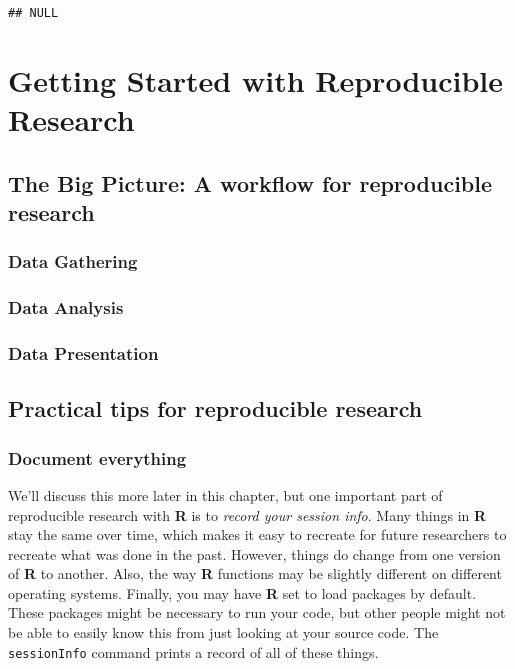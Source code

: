 \documentclass[ChapterTOCs,krantz1]{krantz}\usepackage{graphicx, color}
\makeatletter
\newenvironment{kframe}{%
 \def\at@end@of@kframe{}%
 \ifinner\ifhmode%
  \def\at@end@of@kframe{\end{minipage}}%
  \begin{minipage}{\columnwidth}%
 \fi\fi%
 \def\FrameCommand##1{\hskip\@totalleftmargin \hskip-\fboxsep
 \colorbox{shadecolor}{##1}\hskip-\fboxsep
     \hskip-\linewidth \hskip-\@totalleftmargin \hskip\columnwidth}%
 \MakeFramed {\advance\hsize-\width
   \@totalleftmargin\z@ \linewidth\hsize
   \@setminipage}}%
 {\par\unskip\endMakeFramed%
 \at@end@of@kframe}
\newenvironment{knitrout}{}{} %
\makeatother
\begin{document}
\begin{knitrout}
\color{fgcolor}\begin{kframe}
\begin{verbatim}
## NULL
\end{verbatim}
\end{kframe}
\end{knitrout}


\chapter{Getting Started with Reproducible Research}

\section{The Big Picture: A workflow for reproducible research}

\subsection{Data Gathering}

\subsection{Data Analysis}

\subsection{Data Presentation}

\section{Practical tips for reproducible research}

\subsection{Document everything}

We'll discuss this more later in this chapter, but one important part of
reproducible research with \textbf{R} is to \emph{record your session
info}. Many things in \textbf{R} stay the same over time, which makes it
easy to recreate for future researchers to recreate what was done in the
past. However, things do change from one version of \textbf{R} to
another. Also, the way \textbf{R} functions may be slightly different on
different operating systems. Finally, you may have \textbf{R} set to
load packages by default. These packages might be necessary to run your
code, but other people might not be able to easily know this from just
looking at your source code. The \texttt{sessionInfo} command prints a
record of all of these things.
\end{document}
